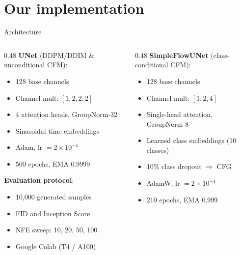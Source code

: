 \documentclass[aspectratio=169,10pt]{beamer}
\begin{document}
\section{Our implementation}

\begin{frame}{Architecture}
\begin{columns}[T]
\begin{column}{0.48\textwidth}
\textbf{UNet} (DDPM/DDIM \& unconditional CFM):
\begin{itemize}
    \item 128 base channels
    \item Channel mult: $[1, 2, 2, 2]$
    \item 4 attention heads, GroupNorm-32
    \item Sinusoidal time embeddings
    \item Adam, lr $= 2 \times 10^{-4}$
    \item 500 epochs, EMA 0.9999
\end{itemize}

\vspace{0.5em}
\textbf{Evaluation protocol}:
\begin{itemize}
    \item 10,000 generated samples
    \item FID and Inception Score
    \item NFE sweep: 10, 20, 50, 100
    \item Google Colab (T4 / A100)
\end{itemize}
\end{column}
\begin{column}{0.48\textwidth}
\textbf{SimpleFlowUNet} (class-conditional CFM):
\begin{itemize}
    \item 128 base channels
    \item Channel mult: $[1, 2, 4]$
    \item Single-head attention, GroupNorm-8
    \item Learned class embeddings (10 classes)
    \item 10\% class dropout $\Rightarrow$ CFG
    \item AdamW, lr $= 2 \times 10^{-4}$
    \item 210 epochs, EMA 0.999
\end{itemize}
\end{column}
\end{columns}
\end{frame}
\end{document}
